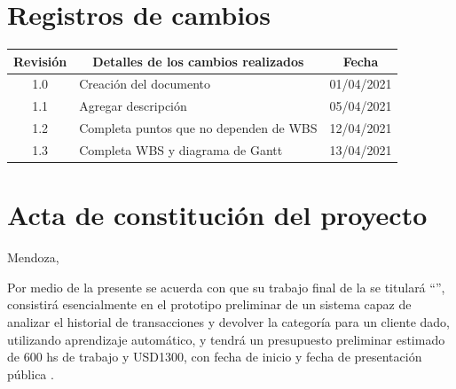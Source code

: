 \documentclass[11pt]{charter}
\begin{document}
\maketitle
\thispagestyle{empty}
\pagebreak


\thispagestyle{empty}
{\setlength{\parskip}{0pt}
\tableofcontents{}
}
\pagebreak


\section{Registros de cambios}
\label{sec:registro}


\begin{table}[ht]
\label{tab:registro}
\centering
\begin{tabularx}{\linewidth}{@{}|c|X|c|@{}}
\hline
\rowcolor[HTML]{C0C0C0} 
Revisión & \multicolumn{1}{c|}{\cellcolor[HTML]{C0C0C0}Detalles de los cambios realizados} & Fecha      \\ \hline
1.0      & Creación del documento                                          & 01/04/2021 \\ \hline
1.1      & Agregar descripción                                          & 05/04/2021 \\ \hline
1.2      & Completa puntos que no dependen de WBS                       & 12/04/2021 \\ \hline
1.3      & Completa WBS y diagrama de Gantt                             & 13/04/2021 \\ \hline
\end{tabularx}
\end{table}

\pagebreak



\section{Acta de constitución del proyecto}
\label{sec:acta}

\begin{flushright}
Mendoza, \fechaInicioName
\end{flushright}

\vspace{2cm}

Por medio de la presente se acuerda con \authorname\hspace{1px} que su trabajo final de la \degreename\hspace{1px} 
se titulará ``\ttitle'', consistirá esencialmente en el prototipo preliminar de un sistema capaz de analizar el historial de 
transacciones y devolver la categoría para un cliente dado, utilizando aprendizaje automático, y tendrá un presupuesto 
preliminar estimado de 600 hs de trabajo y USD1300, con fecha de inicio \fechaInicioName\hspace{1px} y fecha de presentación 
pública \fechaFinalName.
\end{document}

